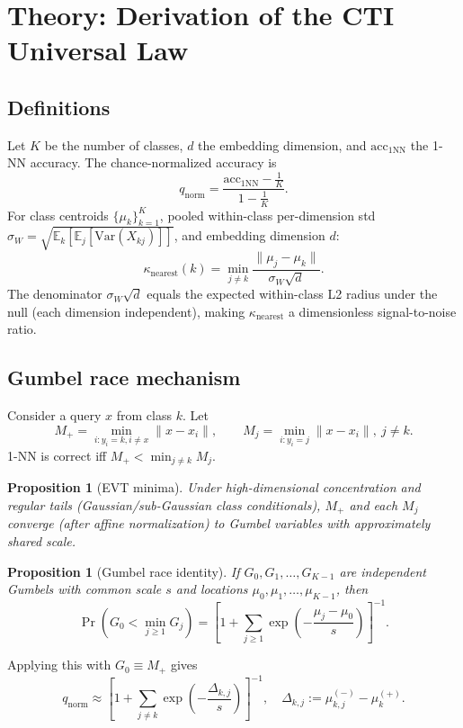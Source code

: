\documentclass{article}
\newtheorem{proposition}[theorem]{Proposition}
\begin{document}
\section{Theory: Derivation of the CTI Universal Law}
\subsection{Definitions}
Let $K$ be the number of classes, $d$ the embedding dimension, and $\mathrm{acc}_{1\mathrm{NN}}$ the 1-NN accuracy.
The chance-normalized accuracy is
\begin{equation}
q_{\mathrm{norm}}=\frac{\mathrm{acc}_{1\mathrm{NN}}-\tfrac{1}{K}}{1-\tfrac{1}{K}}.
\end{equation}
For class centroids $\{\mu_k\}_{k=1}^K$, pooled within-class per-dimension std $\sigma_W=\sqrt{\mathbb{E}_k[\mathbb{E}_j[\mathrm{Var}(X_{kj})]]}$, and embedding dimension $d$:
\begin{equation}
\kappa_{\mathrm{nearest}}(k)=\min_{j\neq k}\frac{\|\mu_j-\mu_k\|}{\sigma_W\sqrt{d}}.
\end{equation}
The denominator $\sigma_W\sqrt{d}$ equals the expected within-class L2 radius under the null (each dimension independent), making $\kappa_{\mathrm{nearest}}$ a dimensionless signal-to-noise ratio.

\subsection{Gumbel race mechanism}
Consider a query $x$ from class $k$. Let
\[
M_+=\min_{i:y_i=k,i\neq x}\|x-x_i\|,\qquad
M_j=\min_{i:y_i=j}\|x-x_i\|,\ j\neq k.
\]
1-NN is correct iff $M_+<\min_{j\neq k}M_j$.

\begin{proposition}[EVT minima]
Under high-dimensional concentration and regular tails (Gaussian/sub-Gaussian class conditionals), $M_+$ and each $M_j$ converge (after affine normalization) to Gumbel variables with approximately shared scale.
\end{proposition}

\begin{proposition}[Gumbel race identity]
If $G_0,G_1,\dots,G_{K-1}$ are independent Gumbels with common scale $s$ and locations $\mu_0,\mu_1,\dots,\mu_{K-1}$, then
\[
\Pr\!\left(G_0<\min_{j\ge1}G_j\right)=
\left[1+\sum_{j\ge1}\exp\!\left(-\frac{\mu_j-\mu_0}{s}\right)\right]^{-1}.
\]
\end{proposition}

Applying this with $G_0\equiv M_+$ gives
\begin{equation}
\label{eq:gumbel-sum}
q_{\mathrm{norm}}
\approx
\left[
1+\sum_{j\neq k}\exp\!\left(-\frac{\Delta_{k,j}}{s}\right)
\right]^{-1},
\quad
\Delta_{k,j}:=\mu_{k,j}^{(-)}-\mu_k^{(+)}.
\end{equation}
\end{document}
